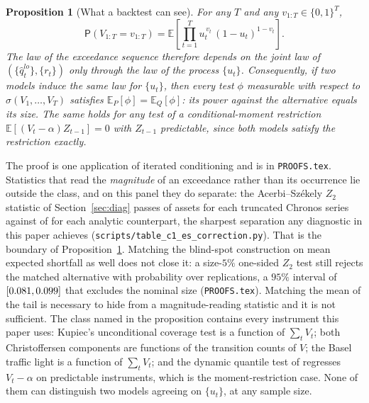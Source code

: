 \documentclass[preprint,11pt,authoryear]{elsarticle}
\newtheorem{proposition}[theorem]{Proposition}
\newcommand{\E}{\mathbb{E}}
\renewcommand{\P}{\mathsf{P}}
\newcommand{\1}{\boldsymbol{1}}
\begin{document}
\begin{proposition}[What a backtest can see]
	\label{prop:identification}
	For any $T$ and any $v_{1:T}\in\{0,1\}^T$,
	\begin{equation}
		\label{eq:path_likelihood}
		\P\left(V_{1:T}=v_{1:T}\right)
		=
		\E\left[\prod_{t=1}^{T} u_t^{\,v_t}\,(1-u_t)^{1-v_t}\right].
	\end{equation}
	The law of the exceedance sequence therefore depends on the joint law of
	$(\{\hat q^{lo}_t\},\{r_t\})$ only through the law of the process
	$\{u_t\}$. Consequently, if two models induce the same law for $\{u_t\}$,
	then every test $\phi$ measurable with respect to $\sigma(V_1,\dots,V_T)$
	satisfies $\E_P[\phi]=\E_Q[\phi]$: its power against the alternative equals
	its size. The same holds for any test of a conditional-moment restriction
	$\E[(V_t-\alpha)Z_{t-1}]=0$ with $Z_{t-1}$ predictable, since both models
	satisfy the restriction exactly.
\end{proposition}

The proof is one application of iterated conditioning and is in \texttt{PROOFS.tex}.
Statistics that read the \emph{magnitude} of an exceedance rather than its
occurrence lie outside the class, and on this panel they do separate: the
Acerbi--Sz\'ekely $Z_2$ statistic of Section~\ref{sec:diag} passes \nMainZTwoPassTrunc{} of
\nMainAssets{} assets for each truncated Chronos series against
\nMainZTwoPassAnalytic{} of
\nMainAssets{} for each analytic counterpart, the sharpest separation any
diagnostic in this paper achieves (\texttt{scripts/table\_c1\_es\_correction.py}). That is the boundary of
Proposition~\ref{prop:identification}. Matching the blind-spot construction on mean expected shortfall as well does not
close it: a size-$5\%$ one-sided $Z_2$ test still rejects the matched
alternative with probability \nSupPowerRej{} over \nSupPowerReps{} replications,
a $95\%$ interval of $[0.081, 0.099]$ that excludes the nominal
size (\texttt{PROOFS.tex}). Matching the mean of the tail is necessary to hide from
a magnitude-reading statistic and it is not sufficient.
The class named in the proposition contains every instrument this paper uses:
Kupiec's unconditional coverage test is a function of $\sum_t V_t$; both
Christoffersen components are functions of the transition counts of $V$; the
Basel traffic light is a function of $\sum_t V_t$; and the dynamic quantile test
of \citet{engle2004caviar} regresses $V_t-\alpha$ on predictable instruments,
which is the moment-restriction case. None of them can distinguish two models
agreeing on $\{u_t\}$, at any sample size.
\end{document}
